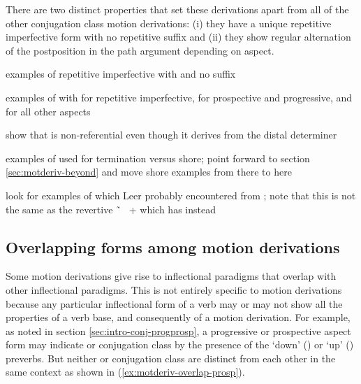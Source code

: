 \documentclass[12pt,letterpaper,oneside,article]{memoir}
\begin{document}
There are two distinct properties that set these derivations apart from all of the other  conjugation class motion derivations: (i) they have a unique  repetitive imperfective form with no repetitive suffix and (ii) they show regular alternation of the postposition in the path argument depending on aspect.

examples of  repetitive imperfective with  and no suffix

examples of  with  for repetitive imperfective,  for prospective and progressive, and  for all other aspects

show that  is non-referential even though it derives from the  distal determiner

examples of  used for termination versus shore; point forward to section \ref{sec:motderiv-beyond} and move shore examples from there to here

look for examples of  which Leer probably encountered from ; note that this is not the same as the revertive  \~\ \  +  which has  instead

\subsection{Overlapping forms among motion derivations}\label{sec:motderiv-overlap}

Some motion derivations give rise to inflectional paradigms that overlap with other inflectional paradigms.
This is not entirely specific to motion derivations because any particular inflectional form of a verb may or may not show all the properties of a verb base, and consequently of a motion derivation.
For example, as noted in section \ref{sec:intro-conj-progprosp}, a progressive or prospective aspect form may indicate  or  conjugation class by the presence of the  ‘down’ () or  ‘up’ () preverbs.
But neither  or  conjugation class are distinct from each other in the same context as shown in (\ref{ex:motderiv-overlap-prosp}).
\end{document}
